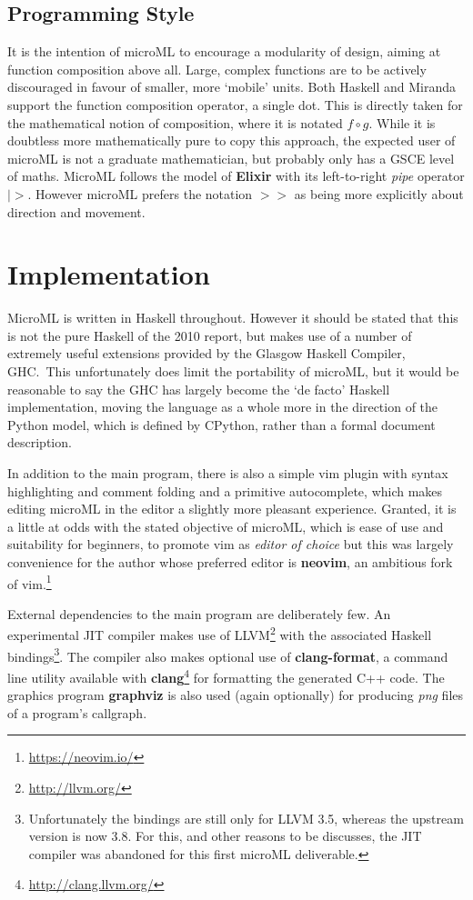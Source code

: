 \documentclass[12pt, a4paper]{report}
\begin{document}
\subsection{Programming Style}
It is the intention of microML to encourage a modularity of design, aiming at function composition
above all. Large, complex functions are to be actively discouraged in favour of smaller, more
`mobile' units. Both Haskell and Miranda support the function composition operator, a single dot.
This is directly taken for the mathematical notion of composition, where it is notated $ f \circ g
$. While it is doubtless more mathematically pure to copy this approach, the expected user of
microML is not a graduate mathematician, but probably only has a GSCE level of maths. MicroML
follows the model of \textbf{Elixir} with its left-to-right \textit{pipe} operator $ |> $. However
microML prefers the notation $ >> $ as being more explicitly about direction and movement.

\section{Implementation}
MicroML is written in Haskell throughout. However it should be stated that this is not the pure
Haskell of the 2010 report, but makes use of a number of extremely useful extensions provided by
the Glasgow Haskell Compiler, GHC.\ This unfortunately does limit the portability of microML, 
but it would be reasonable to say the GHC has largely become the `de facto' Haskell implementation, moving the
language as a whole more in the direction of the Python model, which is defined by CPython, 
rather than a formal document description.

In addition to the main program, there is also a simple vim plugin with syntax highlighting and
comment folding and a primitive autocomplete, which makes editing microML in the editor a slightly more pleasant experience.
Granted, it is a little at odds with the stated objective of microML, which is ease of use and
suitability for beginners, to promote vim as \textit{editor of choice} but this was largely
convenience for the author whose preferred editor is \textbf{neovim}, an ambitious fork of
vim.\footnote{\url{https://neovim.io/}} 

External dependencies to the main program are deliberately few. An experimental JIT compiler makes
use of LLVM\footnote{\url{http://llvm.org/}} with the associated Haskell
bindings\footnote{Unfortunately the bindings are still only for LLVM 3.5, whereas the upstream
version is now 3.8. For this, and other reasons to be discusses, the JIT compiler was abandoned for
this first microML deliverable.}. The compiler also makes optional use of \textbf{clang-format}, a
command line utility available with \textbf{clang}\footnote{\url{http://clang.llvm.org/}} for formatting 
the generated C++ code. The graphics program \textbf{graphviz} is also used (again optionally) for 
producing \textit{png} files of a program's callgraph. 
\end{document}

